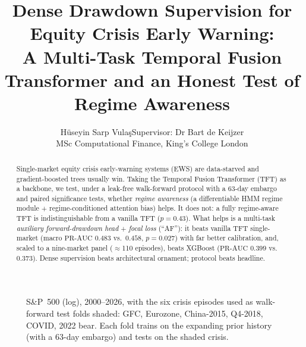 \documentclass[10pt,a4paper,twocolumn]{article}
\title{\vspace{-1.2cm}\bfseries Dense Drawdown Supervision for Equity Crisis
Early Warning:\\ A Multi-Task Temporal Fusion Transformer and an Honest Test
of Regime Awareness}
\author{H\"useyin Sarp Vula\c{s}\quad\small Supervisor: Dr Bart de Keijzer\\
\small MSc Computational Finance, King's College London}
\date{\vspace{-0.4cm}}
\newcommand{\prauc}{\mbox{PR-AUC}}
\begin{document}
\maketitle
\thispagestyle{empty}\pagestyle{empty}

\begin{abstract}\small\noindent
Single-market equity crisis early-warning systems (EWS) are data-starved and
gradient-boosted trees usually win. Taking the Temporal Fusion Transformer
(TFT) as a backbone, we test, under a leak-free walk-forward protocol with a
63-day embargo and paired significance tests, whether \emph{regime awareness}
(a differentiable HMM regime module $+$ regime-conditioned attention bias)
helps. It does not: a fully regime-aware TFT is indistinguishable from a
vanilla TFT ($p{=}0.43$). What helps is a multi-task \emph{auxiliary
forward-drawdown head} $+$ \emph{focal loss} (``AF''): it beats vanilla TFT
single-market (macro $\prauc$ $0.483$ vs.\ $0.458$, $p{=}0.027$) with far
better calibration, and, scaled to a nine-market panel ($\approx$110
episodes), beats XGBoost ($\prauc$ $0.399$ vs.\ $0.373$). Dense supervision
beats architectural ornament; protocol beats headline.
\end{abstract}

\begin{figure}[t]
\centering
{}
\caption{S\&P~500 (log), 2000--2026, with the six crisis episodes used as
walk-forward test folds shaded: GFC, Eurozone, China-2015, Q4-2018, COVID,
2022 bear. Each fold trains on the expanding prior history (with a 63-day
embargo) and tests on the shaded crisis.}
\label{fig:timeline}
\end{figure}
\end{document}

